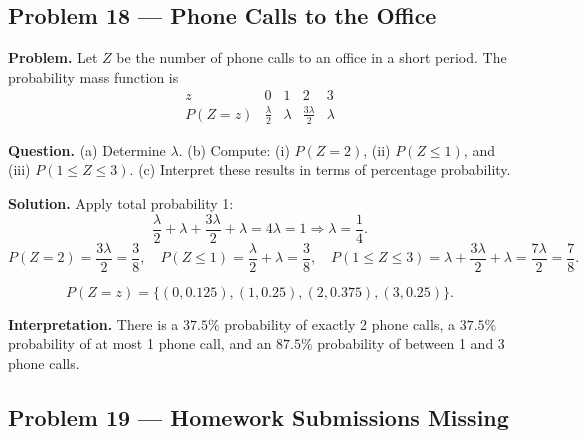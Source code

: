 \begin{ExamProblems}
		
		\item
		\subsection*{Problem 18 — Phone Calls to the Office}
		
		\textbf{Problem.}
		Let $Z$ be the number of phone calls to an office in a short period. The probability mass function is
		\[
		\begin{array}{c|cccc}
			z & 0 & 1 & 2 & 3\\
			\hline
			P(Z=z) & \frac{\lambda}{2} & \lambda & \frac{3\lambda}{2} & \lambda
		\end{array}
		\]
		
		\textbf{Question.}
		(a) Determine $\lambda$.
		(b) Compute: (i) $P(Z=2)$, (ii) $P(Z\le 1)$, and (iii) $P(1\le Z\le 3)$.
		(c) Interpret these results in terms of percentage probability.
		
		\textbf{Solution.}
		Apply total probability 1:
		\[
		\frac{\lambda}{2}+\lambda+\frac{3\lambda}{2}+\lambda=4\lambda=1\Rightarrow \lambda=\frac{1}{4}.
		\]
		\[
		P(Z=2)=\frac{3\lambda}{2}=\frac{3}{8},\quad
		P(Z\le 1)=\frac{\lambda}{2}+\lambda=\frac{3}{8},\quad
		P(1\le Z\le 3)=\lambda+\frac{3\lambda}{2}+\lambda=\frac{7\lambda}{2}=\frac{7}{8}.
		\]
		
\[
		P(Z=z)=\{(0,0.125),(1,0.25),(2,0.375),(3,0.25)\}.
		\]
\begin{center}
		\end{center}
\textbf{Interpretation.} There is a $37.5\%$ probability of exactly 2 phone calls, a $37.5\%$ probability of at most 1 phone call, and an $87.5\%$ probability of between 1 and 3 phone calls.
		
		
		\item
		\subsection*{Problem 19 — Homework Submissions Missing}
		

\end{ExamProblems}
